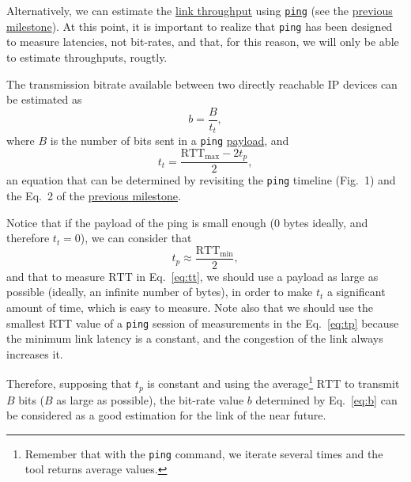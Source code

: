 Alternatively, we can estimate the
\href{https://en.wikipedia.org/wiki/Throughput}{link throughput} using
\href{https://github.com/torvalds/linux/blob/master/net/ipv4/ping.c}{\texttt{ping}}
(see the
\href{https://tecnologias-multimedia.github.io/study_guide/latency/}{previous
  milestone}). At this point, it is important to realize that
\texttt{ping} has been designed to measure latencies, not bit-rates,
and that, for this reason, we will only be able to estimate
throughputs, rougtly.

The transmission bitrate available between two directly reachable IP
devices can be estimated as
\begin{equation}
  b=\frac{B}{t_t},
  \label{eq:b}
\end{equation}
where $B$ is the number of bits sent in a \verb|ping|
\href{https://en.wikipedia.org/wiki/Payload_(computing)}{payload}, and
\begin{equation}
  t_t = \frac{\text{RTT}_{\text{max}}-2t_p}{2},
  \label{eq:tt}
\end{equation}
an equation that can be determined by revisiting the \verb|ping|
timeline (Fig.~1) and the Eq.~2 of the
\href{https://tecnologias-multimedia.github.io/study_guide/latency/}{previous
  milestone}.

Notice that if the payload of the ping is small enough ($0$ bytes
ideally, and therefore $t_t=0$), we can consider that
\begin{equation}
  t_p \approx \frac{\text{RTT}_{\text{min}}}{2},
  \label{eq:tp}
\end{equation}
and that to measure $\text{RTT}$ in Eq.~\eqref{eq:tt}, we
should use a payload as large as possible (ideally, an infinite number
of bytes), in order to make $t_t$ a significant amount of time, which is easy
to measure. Note also that we should use the smallest RTT value of a
\texttt{ping} session of measurements in the Eq.~\eqref{eq:tp} because
the minimum link latency is a constant, and the congestion of the link
always increases it.

Therefore, supposing that $t_p$ is constant and using the
average\footnote{Remember that with the \texttt{ping} command, we
iterate several times and the tool returns average values.}
$\text{RTT}$ to transmit $B$ bits ($B$ as large as possible), the
bit-rate value $b$ determined by Eq.~\eqref{eq:b} can be considered as
a good estimation for the link of the near future.

